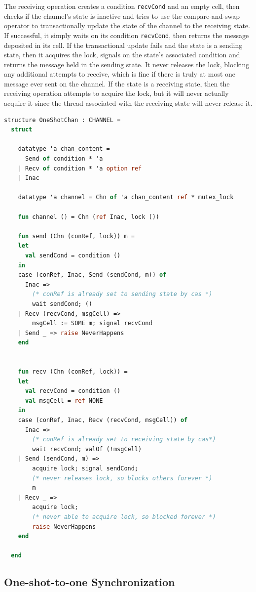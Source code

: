 \documentclass[10pt]{article}
\begin{document}
The receiving operation creates a condition \lstinline{recvCond} and an empty cell,
then checks if the channel's state is inactive and tries to use the
compare-and-swap operator to transactionally update the state of the channel to
the receiving state.  If successful, it simply waits on its condition \lstinline{recvCond},
then returns the message deposited in its cell.
If the transactional update fails and the state is a sending state,
then it acquires the lock, signals on the state's associated condition and returns the message
held in the sending state.  It never releases the lock, blocking any additional attempts to receive,
which is fine if there is truly at most one message ever sent on the channel.
If the state is a receiving state, then the receiving operation attempts to acquire the lock,
but it will never actually acquire it since the thread associated with the receiving state will
never release it.


\begin{lstlisting}[language=ML, mathescape]
  structure OneShotChan : CHANNEL =
  struct

    datatype 'a chan_content =
      Send of condition * 'a
    | Recv of condition * 'a option ref
    | Inac  

    datatype 'a channel = Chn of 'a chan_content ref * mutex_lock

    fun channel () = Chn (ref Inac, lock ())

    fun send (Chn (conRef, lock)) m =
    let
      val sendCond = condition ()
    in
    case (conRef, Inac, Send (sendCond, m)) of
      Inac =>
        (* conRef is already set to sending state by cas *)
        wait sendCond; ()
    | Recv (recvCond, msgCell) =>
        msgCell := SOME m; signal recvCond
    | Send _ => raise NeverHappens
    end


    fun recv (Chn (conRef, lock)) =
    let
      val recvCond = condition ()
      val msgCell = ref NONE 
    in
    case (conRef, Inac, Recv (recvCond, msgCell)) of
      Inac =>
        (* conRef is already set to receiving state by cas*)
        wait recvCond; valOf (!msgCell)
    | Send (sendCond, m) =>
        acquire lock; signal sendCond;
        (* never releases lock, so blocks others forever *)
        m
    | Recv _ =>
        acquire lock;
        (* never able to acquire lock, so blocked forever *)
        raise NeverHappens
    end

  end
\end{lstlisting}


\subsection{One-shot-to-one Synchronization}
\end{document}
